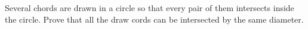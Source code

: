 \problem
Several chords are drawn in a circle so that every pair of them intersects
inside the circle.
Prove that all the draw cords can be intersected by the same diameter.
\solution
\endproblem

